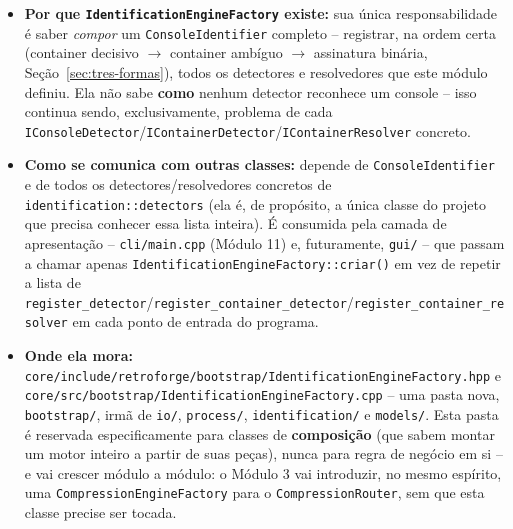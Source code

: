 \begin{itemize}
    \item \textbf{Por que \texttt{IdentificationEngineFactory} existe:} sua única responsabilidade é saber \textit{compor} um \texttt{ConsoleIdentifier} completo -- registrar, na ordem certa (container decisivo $\rightarrow$ container ambíguo $\rightarrow$ assinatura binária, Seção~\ref{sec:tres-formas}), todos os detectores e resolvedores que este módulo definiu. Ela não sabe \textbf{como} nenhum detector reconhece um console -- isso continua sendo, exclusivamente, problema de cada \texttt{IConsoleDetector}/\texttt{IContainerDetector}/\texttt{IContainerResolver} concreto.
    \item \textbf{Como se comunica com outras classes:} depende de \texttt{ConsoleIdentifier} e de todos os detectores/resolvedores concretos de \texttt{identification::detectors} (ela é, de propósito, a única classe do projeto que precisa conhecer essa lista inteira). É consumida pela camada de apresentação -- \texttt{cli/main.cpp} (Módulo 11) e, futuramente, \texttt{gui/} -- que passam a chamar apenas \texttt{IdentificationEngineFactory::criar()} em vez de repetir a lista de \texttt{register\_detector}/\texttt{register\_container\_detector}/\texttt{register\_container\_resolver} em cada ponto de entrada do programa.
    \item \textbf{Onde ela mora:} \texttt{core/include/retroforge/bootstrap/IdentificationEngineFactory.hpp} e \texttt{core/src/bootstrap/IdentificationEngineFactory.cpp} -- uma pasta nova, \texttt{bootstrap/}, irmã de \texttt{io/}, \texttt{process/}, \texttt{identification/} e \texttt{models/}. Esta pasta é reservada especificamente para classes de \textbf{composição} (que sabem montar um motor inteiro a partir de suas peças), nunca para regra de negócio em si -- e vai crescer módulo a módulo: o Módulo 3 vai introduzir, no mesmo espírito, uma \texttt{CompressionEngineFactory} para o \texttt{CompressionRouter}, sem que esta classe precise ser tocada.
\end{itemize}

